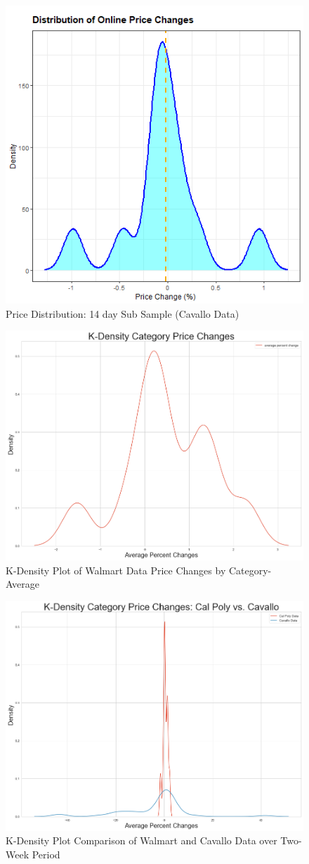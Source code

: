 \newpage
\begin{figure}
\centering
\includegraphics[width=.7\textwidth]{sub_dist.png}
\caption{Price Distribution: 14 day Sub Sample (Cavallo Data)}
\label{fig:sub_dist}
\end{figure}



\newpage
\begin{figure}
\centering
\includegraphics[width=.7\textwidth]{KDensity_Category_Price_Changes.png}
\caption{K-Density Plot of Walmart Data Price Changes by Category-Average}
\label{fig:avg_walmart_category}
\end{figure}

\newpage
\begin{figure}
\centering
\includegraphics[width=.7\textwidth]{KDensity_Category_Price_Changes - Poly_vs_Cavallo - 2Week.png}
\caption{K-Density Plot Comparison of Walmart and Cavallo Data over Two-Week Period}
\label{fig:walmart-cavallo}
\end{figure}

